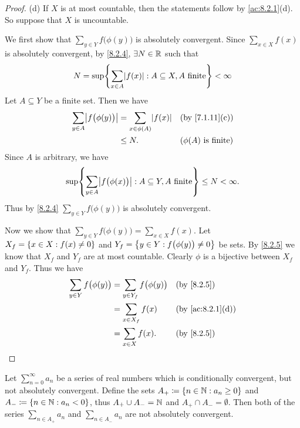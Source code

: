 \begin{proof}{(d)}
	If \(X\) is at most countable, then the statements follow by \cref{ac:8.2.1}(d).
	So suppose that \(X\) is uncountable.

	We first show that \(\sum_{y \in Y} f\big(\phi(y)\big)\) is absolutely convergent.
	Since \(\sum_{x \in X} f(x)\) is absolutely convergent, by \cref{8.2.4}, \(\exists N \in \mathbb{R}\) such that
	\[
		N = \sup\set{\sum_{x \in A} \abs{f(x)} : A \subseteq X, A \text{ finite}} < \infty
	\]
	Let \(A \subseteq Y\) be a finite set.
	Then we have
	\begin{align*}
		\sum_{y \in A} \abs{f\big(\phi(y)\big)} & = \sum_{x \in \phi(A)} \abs{f(x)} &  & \text{(by \cref{7.1.11}(c))}   \\
		                                        & \leq N.                           &  & \text{(\(\phi(A)\) is finite)}
	\end{align*}
	Since \(A\) is arbitrary, we have
	\[
		\sup\set{\sum_{y \in A} \abs{f\big(\phi(x)\big)} : A \subseteq Y, A \text{ finite}} \leq N < \infty.
	\]
	Thus by \cref{8.2.4} \(\sum_{y \in Y} f\big(\phi(y)\big)\) is absolutely convergent.

	Now we show that \(\sum_{y \in Y} f\big(\phi(y)\big) = \sum_{x \in X} f(x)\).
	Let \(X_f = \left\lbrace x \in X : f(x) \neq 0\right\rbrace\) and \(Y_f = \left\lbrace y \in Y : f\big(\phi(y)\big) \neq 0\right\rbrace\) be sets.
	By \cref{8.2.5} we know that \(X_f\) and \(Y_f\) are at most countable.
	Clearly \(\phi\) is a bijective between \(X_f\) and \(Y_f\).
	Thus we have
	\begin{align*}
		\sum_{y \in Y} f\big(\phi(y)\big) & = \sum_{y \in Y_f} f\big(\phi(y)\big) &  & \by{8.2.5}                     \\
		                                  & = \sum_{x \in X_f} f(x)               &  & \text{(by \cref{ac:8.2.1}(d))} \\
		                                  & = \sum_{x \in X} f(x).                &  & \by{8.2.5}
	\end{align*}
\end{proof}

\begin{lem}\label{8.2.7}
	Let \(\sum_{n = 0}^\infty a_n\) be a series of real numbers which is conditionally convergent, but not absolutely convergent.
	Define the sets \(A_+ \coloneqq \left\lbrace n \in \mathbb{N} : a_n \geq 0\right\rbrace\) and \(A_- \coloneqq \left\lbrace n \in \mathbb{N} : a_n < 0\right\rbrace\), thus \(A_+ \cup A_- = \mathbb{N}\) and \(A_+ \cap A_- = \emptyset\).
	Then both of the series \(\sum_{n \in A_+} a_n\) and \(\sum_{n \in A_-} a_n\) are not absolutely convergent.
\end{lem}


